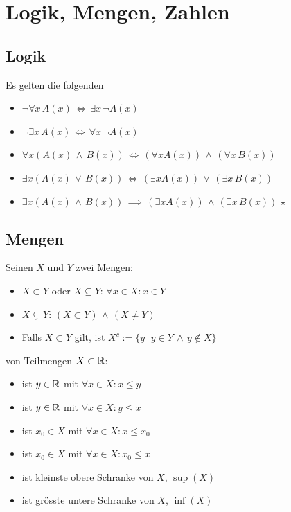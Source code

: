 \section{Logik, Mengen, Zahlen}
\subsection{Logik}

\Satz Es gelten die folgenden 
\vspace{-0.6em}
\begin{itemize}
    \item $\lnot \forall x \, A(x) \, \iff \, \exists x \, \lnot A(x)$
    \item $\lnot \exists x \, A(x) \, \iff \, \forall x \, \lnot A(x)$
    \item $\forall x (A(x) \, \land \, B(x)) \, \iff \, (\forall x A(x)) \, \land \, (\forall x \, B(x))$
    \item $\exists x (A(x) \, \lor \, B(x)) \, \iff \, (\exists x A(x)) \, \lor \, (\exists x \, B(x))$
    \item $\exists x (A(x) \, \land \, B(x)) \, \implies \, (\exists x A(x)) \, \land \, (\exists x \, B(x))$ \hspace{10pt} $\star$
\end{itemize}

\subsection{Mengen}

\Def Seinen $X$ und $Y$ zwei Mengen:
\vspace{-0.6em}
\begin{itemize}
    \item {} $X \subset Y$ oder $X \subseteq Y$: $\forall x \in X : x \in Y$
    \item {} $X \subsetneq Y$: $(X \subset Y) \, \land \, (X\ne Y)$
    \item {} Falls $X \subset Y$ gilt, ist $X^c := \{y \, | \, y \in Y \, \land \, y \notin X\}$
\end{itemize}

\Def {} von Teilmengen $X \subset \mathbb{R}$:
\vspace{-0.6em}
\begin{itemize}
    \item {} ist $y \in \mathbb{R}$ mit $\forall x \in X : x\le y$
    \item {} ist $y \in \mathbb{R}$ mit $\forall x \in X : y\le x$
    \item {} ist $x_0 \in X$ mit $\forall x \in X : x\le x_0$
    \item {} ist $x_0 \in X$ mit $\forall x \in X : x_0\le x$
    \item {} ist kleinste obere Schranke von $X$, $\sup(X)$
    \item {} ist grösste untere Schranke von $X$, $\inf(X)$
\end{itemize}

